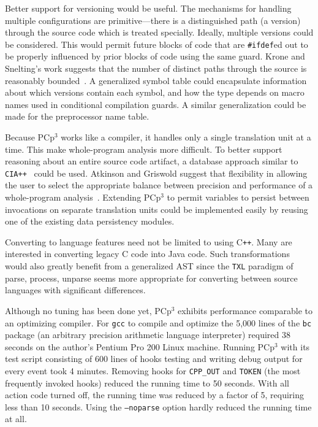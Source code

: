 \documentclass{article}
\newcommand{\pcp}{\mbox{\textsf{PCp}$^3$}}
\newcommand{\CPP}{\mbox{\textsf{C\texttt{++}}}}
\newcommand{\C}{\mbox{\textsf{C}}}
\newcommand{\ppd}[1]{\texttt{\##1}}
\begin{document}
Better support for versioning would be useful. The mechanisms for
handling multiple configurations are primitive---there is a
distinguished path (a version) through the source code which is treated
specially.  Ideally, multiple versions could be considered.  This would
permit future blocks of code that are \ppd{ifdef}ed out to be properly
influenced by prior blocks of code using the same guard.  Krone and
Snelting's work suggests that the number of distinct paths through the
source is reasonably bounded~\cite{Krone94}.  A generalized symbol table
could encapsulate information about which versions contain each symbol,
and how the type depends on macro names used in conditional compilation
guards.  A similar generalization could be made for the preprocessor
name table.

Because \pcp{} works like a compiler, it handles only a single
translation unit at a time.  This make whole-program analysis more
difficult.  To better support reasoning about an entire source code
artifact, a database approach similar to \texttt{CIA++}~\cite{CIA++90}
could be used.  Atkinson and Griswold suggest that flexibility in allowing
the user to select the appropriate balance between precision and
performance of a whole-program analysis~\cite{Atkinson96}.  Extending
\pcp{} to permit variables to persist between invocations on separate
translation units could be implemented easily by reusing one of the
existing data persistency modules.

Converting to language features need not be limited to using \CPP{}.
Many are interested in converting legacy \C{} code into Java code.  Such
transformations would also greatly benefit from a generalized AST since
the \texttt{TXL} paradigm of parse, process, unparse \cite{TXL} seems
more appropriate for converting between source languages with
significant differences.

Although no tuning has been done yet, \pcp{} exhibits performance
comparable to an optimizing compiler.  For \texttt{gcc} to compile and
optimize the 5,000 lines of the \texttt{bc} package (an arbitrary
precision arithmetic language interpreter) required 38 seconds on the
author's Pentium Pro 200 Linux machine. Running \pcp{} with its test
script consisting of 600 lines of hooks testing and writing debug output
for every event took 4 minutes.  Removing hooks for \texttt{CPP\_OUT}
and \texttt{TOKEN} (the most frequently invoked hooks) reduced the
running time to 50 seconds.  With all action code turned off, the
running time was reduced by a factor of 5, requiring less than 10
seconds.  Using the \texttt{--noparse} option hardly reduced the running
time at all.
\end{document}
